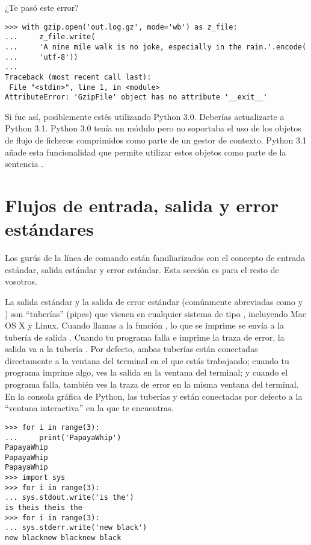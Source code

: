 ¿Te pasó este error?

\noindent\begin{minipage}{\textwidth}
\begin{lstlisting}[mathescape=True]
>>> with gzip.open('out.log.gz', mode='wb') as z_file:
...     z_file.write(
...     'A nine mile walk is no joke, especially in the rain.'.encode(
...     'utf-8'))
... 
Traceback (most recent call last):
 File "<stdin>", line 1, in <module>
AttributeError: 'GzipFile' object has no attribute '__exit__'
\end{lstlisting}
\end{minipage}

Si fue así, posiblemente estés utilizando Python 3.0. Deberías actualizarte a Python 3.1.
Python 3.0 tenía un módulo  pero no soportaba el uso de los objetos de flujo de ficheros comprimidos como parte de un gestor de contexto. Python 3.1 añade esta funcionalidad que permite utilizar estos objetos como parte de la sentencia .

\section{Flujos de entrada, salida y error estándares}

Los gurús de la línea de comando están familiarizados con el concepto de entrada estándar, salida estándar y error estándar. Esta sección es para el resto de vosotros.


La salida estándar y la salida de error estándar (comúnmente abreviadas como  y ) son ``tuberías'' (pipes) que vienen en cualquier sistema de tipo , incluyendo Mac OS X y Linux. Cuando llamas a la función , lo que se imprime se envía a la tubería de salida . Cuando tu programa falla e imprime la traza de error, la salida va a la tubería . Por defecto, ambas tuberías están conectadas directamente a la ventana del terminal en el que estás trabajando; cuando tu programa imprime algo, ves la salida en la ventana del terminal; y cuando el programa falla, también ves la traza de error en la misma ventana del terminal. En la consola gráfica de Python, las tuberías  y  están conectadas por defecto a la ``ventana interactiva'' en la que te encuentras.

\noindent\begin{minipage}{\textwidth}
\begin{lstlisting}[mathescape=True]
>>> for i in range(3):
...     print('PapayaWhip')
PapayaWhip
PapayaWhip
PapayaWhip
>>> import sys
>>> for i in range(3):
... sys.stdout.write('is the')
is theis theis the
>>> for i in range(3):
... sys.stderr.write('new black')
new blacknew blacknew black
\end{lstlisting}
\end{minipage}

